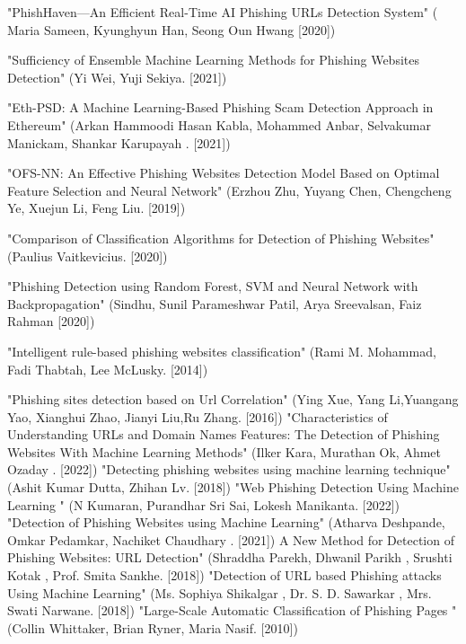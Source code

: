 \newpage
{}
\begin{thebibliography}{99}
	 "PhishHaven—An Efficient Real-Time AI Phishing URLs Detection System" ( Maria Sameen, Kyunghyun Han, Seong Oun Hwang [2020])
	
	"Sufficiency of Ensemble Machine Learning Methods for Phishing Websites Detection"
	(Yi Wei, Yuji Sekiya. [2021])
	
	"Eth-PSD: A Machine Learning-Based Phishing Scam Detection Approach in Ethereum" (Arkan Hammoodi Hasan Kabla, Mohammed Anbar, Selvakumar Manickam, Shankar Karupayah
. [2021])
	
	"OFS-NN: An Effective Phishing Websites Detection Model Based on Optimal Feature Selection and Neural Network" (Erzhou Zhu, Yuyang Chen, Chengcheng Ye, Xuejun Li, Feng Liu. [2019])
	
	"Comparison of Classification Algorithms for Detection of Phishing Websites" (Paulius Vaitkevicius. [2020])
	
	"Phishing Detection using Random Forest, SVM and Neural Network with Backpropagation" (Sindhu, Sunil Parameshwar Patil, Arya Sreevalsan,  Faiz Rahman	[2020])
	
	"Intelligent rule-based phishing websites classification" (Rami M. Mohammad, Fadi Thabtah, Lee McLusky. [2014])
	
	"Phishing sites detection based on Url Correlation" (Ying Xue, Yang Li,Yuangang Yao, Xianghui Zhao, Jianyi Liu,Ru Zhang. [2016])
	"Characteristics of Understanding URLs and Domain Names Features: The Detection of Phishing Websites With Machine Learning Methods" (Ilker Kara, Murathan Ok, Ahmet Ozaday
. [2022])
	"Detecting phishing websites using machine learning technique" (Ashit Kumar Dutta, Zhihan Lv. [2018])
	"Web Phishing Detection Using Machine Learning " (N Kumaran, Purandhar Sri Sai, Lokesh Manikanta. [2022])
	"Detection of Phishing Websites using Machine Learning" (Atharva Deshpande, Omkar Pedamkar, Nachiket Chaudhary . [2021])
	A New Method for Detection of Phishing Websites: URL Detection" (Shraddha Parekh,
Dhwanil Parikh ,
Srushti Kotak , Prof. Smita Sankhe. [2018])
	"Detection of URL based Phishing attacks Using Machine Learning" (Ms. Sophiya Shikalgar , Dr. S. D. Sawarkar , Mrs. Swati Narwane. [2018])
	"Large-Scale Automatic Classification of Phishing Pages 
" (Collin Whittaker, Brian Ryner, Maria Nasif. [2010])





\end{thebibliography}


